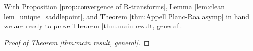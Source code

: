 \documentclass[reqno]{amsart}
\newcommand{\1}{\mathbf{1}}
\newcommand{\dd}{\mathrm{d}}
\newcommand{\C}{\mathbb{C}}
\renewcommand\Re{\operatorname{Re}}
\theoremstyle{plain}
\theoremstyle{definition}
\theoremstyle{remark}
\numberwithin{equation}{section}
\begin{document}
With Proposition \ref{prop:convergence of R-transforms}, Lemma  \ref{lem:clean lem_unique_saddlepoint}, and Theorem \ref{thm:Appell Planc-Roa asymp} in hand we are ready to prove Theorem \ref{thm:main result, general}. \begin{proof}[Proof of Theorem \ref{thm:main result, general}]

\end{proof}
\end{document}
